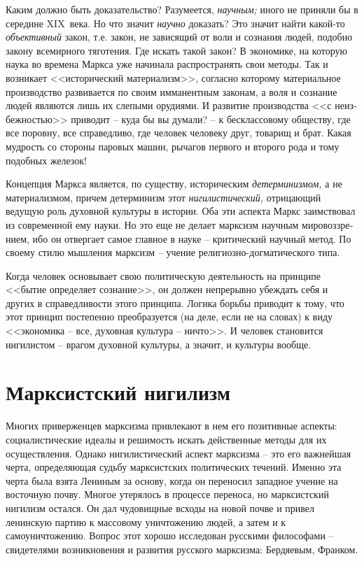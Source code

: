 \documentclass{book}
\begin{document}
Каким должно быть доказательство? Разумеется, \textit{научным;} иного не приняли бы в середине XIX~века. Но что значит 
\textit{научно} доказать?  Это значит найти какой-то \textit{объективный}  закон, т.е. закон, не зависящий от воли и сознания 
людей, подобно закону всемирного тяготения. Где искать такой закон? В экономике, на которую наука во времена Маркса уже начинала 
распространять свои методы. Так и возникает <<исторический материализм>>, со­гласно которому материальное производство 
развивается по своим имманентным законам, а воля и сознание людей являются лишь их слепыми орудиями. И развитие производства <<с 
неиз­бежностью>> приводит -- куда бы вы думали? -- к бесклассовому обществу, где все поровну, все справедливо, где человек 
челове­ку друг, товарищ и брат. Какая мудрость со стороны паровых машин, рычагов первого и второго рода и тому подобных желе­зок!

Концепция Маркса является, по существу, историческим \textit{детерминизмом,}  а не материализмом, причем детерминизм этот 
\textit{нигилистический,}  отрицающий ведущую роль духовной культуры в истории. Оба эти аспекта Маркс заимствовал из современной 
ему науки. Но это еще не делает марксизм научным мировоззре­нием, ибо он отвергает самое главное в науке -- критический научный 
метод. По своему стилю мышления марксизм -- учение религиозно-догматического типа.

Когда человек основывает свою политическую деятельность на принципе <<бытие определяет сознание>>, он должен непрерывно убеждать 
себя и других в справедливости этого принципа. Логика борьбы приводит к тому, что этот принцип постепенно преобразуется (на 
деле, если не на словах) к виду <<экономика -- все, духовная культура -- ничто>>. И человек становится нигилистом -- врагом 
духовной культуры, а значит, и культуры вообще.



\section{Марксистский нигилизм}


Многих приверженцев марксизма привлекают в нем его пози­тивные аспекты: социалистические идеалы и решимость искать действенные 
методы для их осуществления. Однако нигилисти­ческий аспект марксизма -- это его важнейшая черта, определя­ющая судьбу 
марксистских политических течений. Именно эта черта была взята Лениным за основу, когда он переносил западное учение на 
восточную почву. Многое утерялось в процессе переноса, но марксистский нигилизм остался. Он дал чудовищные всходы на новой почве 
и привел ленинскую партию к массовому уничтожению людей, а затем и к самоуничтожению. Вопрос этот хорошо исследован русскими 
философами -- свидетелями воз­никновения и развития русского марксизма: Бердяевым, Фран­ком.
\end{document}

